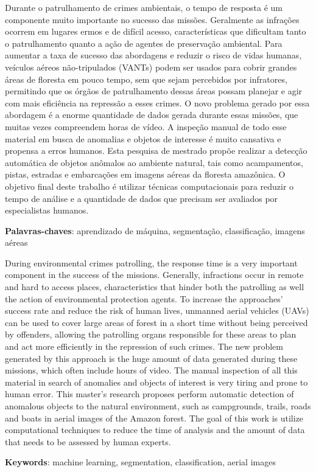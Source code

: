 \begin{resumo}
    Durante o patrulhamento de crimes ambientais, o tempo de resposta é um componente muito importante no sucesso das missões. Geralmente as infrações ocorrem em lugares ermos e de difícil acesso, características que dificultam tanto o patrulhamento quanto a ação de agentes de preservação ambiental. Para aumentar a taxa de sucesso das abordagens e reduzir o risco de vidas humanas, veículos aéreos não-tripulados (VANTs) podem ser usados para cobrir grandes áreas de floresta em pouco tempo, sem que sejam percebidos por infratores, permitindo que os órgãos de patrulhamento dessas áreas possam planejar e agir com mais eficiência na repressão a esses crimes. O novo problema gerado por essa abordagem é a enorme quantidade de dados gerada durante essas missões, que muitas vezes compreendem horas de vídeo. A inspeção manual de todo esse material em busca de anomalias e objetos de interesse é muito cansativa e propensa a erros humanos. Esta pesquisa de mestrado propõe realizar a detecção automática de objetos anômalos ao ambiente natural, tais como acampamentos, pistas, estradas e embarcações em imagens aéreas da floresta amazônica. O objetivo final deste trabalho é utilizar técnicas computacionais para reduzir o tempo de análise e a quantidade de dados que precisam ser avaliados por especialistas humanos.

    \vspace{\onelineskip}
    \noindent
    \textbf{Palavras-chaves}: aprendizado de máquina, segmentação, classificação, imagens aéreas
\end{resumo}

\begin{resumo}[Abstract]
    During environmental crimes patrolling, the response time is a very important component in the success of the missions. Generally, infractions occur in remote and hard to access places, characteristics that hinder both the patrolling as well the action of environmental protection agents. To increase the approaches' success rate and reduce the risk of human lives, unmanned aerial vehicles (UAVs) can be used to cover large areas of forest in a short time without being perceived by offenders, allowing the patrolling organs responsible for these areas to plan and act more efficiently in the repression of such crimes. The new problem generated by this approach is the huge amount of data generated during these missions, which often include hours of video. The manual inspection of all this material in search of anomalies and objects of interest is very tiring and prone to human error. This master's research proposes perform automatic detection of anomalous objects to the natural environment, such as campgrounds, trails, roads and boats in aerial images of the Amazon forest. The goal of this work is utilize computational techniques to reduce the time of analysis and the amount of data that needs to be assessed by human experts.
    
    \vspace{\onelineskip}
    \noindent
    \textbf{Keywords}: machine learning, segmentation, classification, aerial images
\end{resumo}
